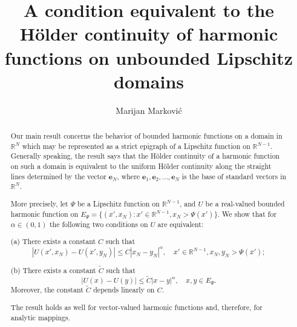 \documentclass[10pt]{amsart}
\theoremstyle{definition}
\numberwithin{equation}{section}
\begin{document}
\title[A condition equivalent to the     H\"{o}lder   continuity]{A condition equivalent to the H\"{o}lder continuity of
harmonic functions on unbounded Lipschitz domains}

\author{Marijan  Markovi\'{c}}

\address{Faculty of Science and Mathematics\endgraf  University of Montenegro\endgraf  D\v{z}ord\v{z}a Va\v{s}ingtona BB
 Podgorica\endgraf Montenegro}


\begin{abstract}
Our main result concerns the behavior of bounded harmonic functions on a domain in   $\mathbb{R}^N$         which may be
represented as a strict epigraph of a Lipschitz function on $\mathbb{R}^{N-1}$. Generally speaking,      the result says
that the H\"{o}lder continuity of a harmonic function on such a domain is equivalent to the  uniform          H\"{o}lder
continuity along the straight lines determined by the vector  $\mathbf{e}_N$,                                      where
$\mathbf{e}_1,\mathbf{e}_2,\dots,\mathbf {e}_N$ is the base of standard vectors in $\mathbb{R}^N$.

More precisely, let $\Psi$ be a Lipschitz function on     $\mathbb {R}^{N-1}$, and $U$ be a real-valued bounded harmonic
function on $E_\Psi=\{(x',x_N): x'\in\mathbb{R}^{N-1}, x_N>\Psi(x')\}$.          We show that for   $\alpha\in(0,1)$ the
following  two conditions on   $U$   are equivalent:

(a) There exists a constant $C$ such that
\begin{equation*}
| U(x',x_N)  -   U(x',y_N)|\le C |x_N - y_N|^\alpha,\quad x'\in \mathbb {R}^{N-1}, x_N, y_N > \Psi (x');
\end{equation*}

(b) There exists   a constant $\tilde {C}$ such that
\begin{equation*}
|U(x) - U (y)|\le \tilde{C}  |x-y|^\alpha,\quad x, y\in E_\Psi.
\end{equation*}
Moreover,   the constant $\tilde {C}$ depends linearly on $C$.

The result holds as well for vector-valued harmonic functions and, therefore, for analytic mappings.
\end{abstract}


\end{document}
